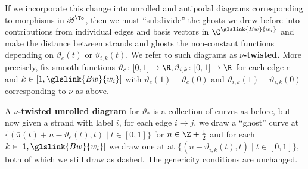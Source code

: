 If
we incorporate this change into unrolled and
antipodal diagrams corresponding to morphisms in $\mathscr{B}^{\To}$,
then we must ``subdivide'' the ghosts we drew before into
contributions from individual edges and basis vectors in $\C^{\glslink{Bw}{w_i}}$
and make the distance between strands and ghosts 
the non-constant functions  depending on $\vartheta_e(t)$ or
$\vartheta_{i,k}(t)$.  
We refer to such diagrams as {\bf $\nu$-twisted.}
More precisely, fix smooth functions
  $\vartheta_e \colon [0,1]\to \R,\vartheta_{i,k}\colon [0,1]\to \R$
  for each edge $e$ and $k\in [1, \glslink{Bw}{w_i}]$   with $\vartheta_e(1)-\vartheta_e(0)$ and 
$\vartheta_{i,k}(1)-\vartheta_{i,k}(0)$ corresponding to $\nu$ as
above.
\begin{definition}
  A {\bf $\nu$-twisted unrolled diagram} for $\vartheta_*$ is a collection of curves as
  before, but now given a strand with label $i$,  for each edge $i\to j$, we draw a ``ghost'' curve at
  $\{(\bar{\pi}(t)+n-\vartheta_e(t),t)\mid t\in [0,1]\}$  for $n\in
  \Z+\frac{1}{2}$ and
  for each $k\in [1,\glslink{Bw}{w_i}]$ we draw one at at
  $\{(n-\vartheta_{i,k}(t),t)\mid t\in [0,1]\}$, both of which
  we still draw as dashed.  The genericity conditions are unchanged.  
\end{definition}

